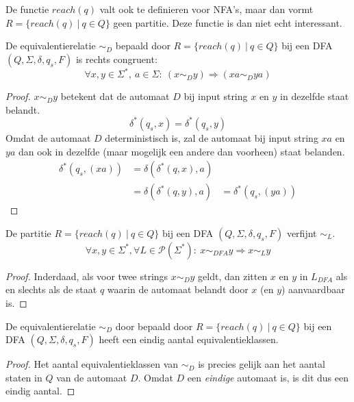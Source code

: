 \documentclass[main.tex]{subfiles}
\begin{document}
\begin{opm}
  De functie $reach(q)$ valt ook te definieren voor NFA's, maar dan vormt $R = \{ reach(q)\ |\ q \in Q \}$ geen partitie.
  Deze functie is dan niet echt interessant.
\end{opm}

\begin{ei}
  \label{ei:sim-dfa-rechts-congruent}
  De equivalentierelatie $\sim_{D}$ bepaald door $R = \{ reach(q)\ |\ q \in Q \}$ bij een DFA $(Q,\Sigma,\delta,q_{s},F)$ is rechts congruent:
  \[ \forall x,y \in \Sigma^{*},\ a \in \Sigma:\ (x \sim_{D} y) \Rightarrow (xa \sim_{D} ya) \]
  \begin{proof}
    $x \sim_{D} y$ betekent dat de automaat $D$ bij input string $x$ en $y$ in dezelfde staat belandt.
    \[ \delta^{*}(q_{s},x) = \delta^{*}(q_{s},y) \]
    Omdat de automaat $D$ deterministisch is, zal de automaat bij input string $xa$ en $ya$ dan ook in dezelfde (maar mogelijk een andere dan voorheen) staat belanden.
    \[
    \begin{array}{rll}
      \delta^{*}(q_{s},(xa)) &= \delta(\delta^{*}(q,x),a) &\\
      &= \delta(\delta^{*}(q,y),a) &= \delta^{*}(q_{s},(ya))
    \end{array}
    \]
  \end{proof}
\end{ei}

\begin{ei}
  \label{ei:sim-dfa-verfijnt-sim-l}
  De partitie $R = \{ reach(q)\ |\ q \in Q \}$ bij een DFA $(Q,\Sigma,\delta,q_{s},F)$ verfijnt $\sim_{L}$.
  \[ \forall x,y \in \Sigma^{*}, \forall L\in \mathcal{P}(\Sigma^{*}):\ x \sim_{DFA} y \Rightarrow x \sim_{L} y\]
  \begin{proof}
    Inderdaad, als voor twee strings $x \sim_{D} y$ geldt, dan zitten $x$ en $y$ in $L_{DFA}$ als en slechts als de staat $q$ waarin de automaat belandt door $x$ (en $y$) aanvaardbaar is.
  \end{proof}
\end{ei}

\begin{ei}
  \label{ei:sim-dfa-eindig-aantal-equivalentieklassen}
  De equivalentierelatie $\sim_{D}$ door bepaald door $R = \{ reach(q)\ |\ q \in Q \}$ bij een DFA $(Q,\Sigma,\delta,q_{s},F)$ heeft een eindig aantal equivalentieklassen.
  \begin{proof}
    Het aantal equivalentieklassen van $\sim_{D}$ is precies gelijk aan het aantal staten in $Q$ van de automaat $D$. Omdat $D$ een \emph{eindige} automaat is, is dit dus een eindig aantal.
  \end{proof}
\end{ei}
\end{document}
